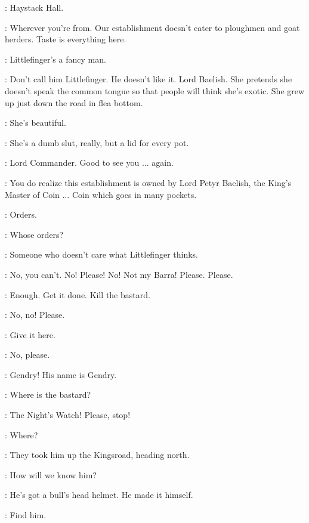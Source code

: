 \DAISY: Haystack Hall.

\ROS: Wherever you're from. Our establishment doesn't cater to ploughmen and goat herders. Taste is everything here.

\DAISY: Littlefinger's a fancy man.

\ROS: Don't call him Littlefinger. He doesn't like it. Lord Baelish.  She pretends she doesn't speak the common tongue so that people will think she's exotic. She grew up just down the road in flea bottom.

\DAISY: She's beautiful.

\ROS: She's a dumb slut, really, but a lid for every pot.


\ROS: Lord Commander. Good to see you $\ldots$ again.


\ROS: You do realize this establishment is owned by Lord Petyr Baelish, the King's Master of Coin $\ldots$ Coin which goes in many pockets.

\JANOSSLYNT: Orders.

\ROS: Whose orders?

\JANOSSLYNT: Someone who doesn't care what Littlefinger thinks.


\MHAEGEN: No, you can't. No! Please! No! Not my Barra! Please. Please.

\JANOSSLYNT: Enough. Get it done. Kill the bastard.


\MHAEGEN: No, no! Please.

\JANOSSLYNT: Give it here.

\MHAEGEN: No, please.



\scene



\TOBHOMOTT: Gendry! His name is Gendry.

\JANOSSLYNT: Where is the bastard?

\TOBHOMOTT: The Night's Watch! Please, stop!

\JANOSSLYNT: Where?

\TOBHOMOTT: They took him up the Kingsroad, heading north.

\JANOSSLYNT: How will we know him?

\TOBHOMOTT: He's got a bull's head helmet. He made it himself.

\JANOSSLYNT:  Find him.



